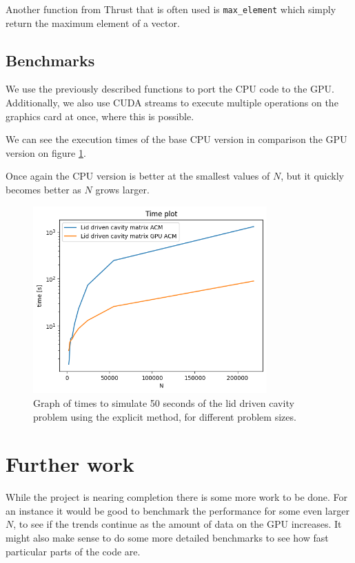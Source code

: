 \documentclass{article}
\begin{document}
Another function from Thrust that is often used is \verb|max_element| which simply return the 
maximum element of a vector.
\subsection{Benchmarks}
We use the previously described functions to port the CPU code to the GPU. Additionally,
we also use CUDA streams to execute multiple operations on the graphics card at once, where 
this is possible. 

We can see the execution times of the base CPU version in comparison the GPU version on figure 
\ref{fig:lidDrivenACM_time}.

Once again the CPU version is better at the smallest values of \(N\), but it quickly becomes 
better as \(N\) grows larger.
\begin{figure}[h!] 
    \centering 
    \includegraphics[width=0.8\textwidth]{lidDrivenACM_time.png} 
    \caption{Graph of times to simulate 50 seconds of the lid driven cavity problem using
    the explicit method, for different problem sizes.} 
    \label{fig:lidDrivenACM_time} 
\end{figure}

\section{Further work}
While the project is nearing completion there is some more work to be done. For an instance it 
would be good to benchmark the performance for some even larger \(N\), to see if the trends continue
as the amount of data on the GPU increases. It might also make sense to do some more detailed 
benchmarks to see how fast particular parts of the code are.
\end{document}
